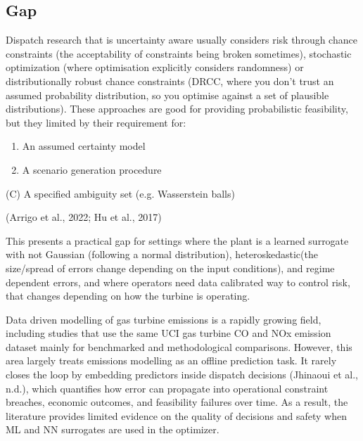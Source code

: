 \documentclass[11pt]{article}
\begin{document}
\subsection{Gap}\label{gap}

Dispatch research that is uncertainty aware usually considers risk
through chance constraints (the acceptability of constraints being
broken sometimes), stochastic optimization (where optimisation
explicitly considers randomness) or distributionally robust chance
constraints (DRCC, where you don't trust an assumed probability
distribution, so you optimise against a set of plausible distributions).
These approaches are good for providing probabilistic feasibility, but
they limited by their requirement for:

\begin{enumerate}
\def\labelenumi{(\Alph{enumi})}
\item
  An assumed certainty model
\item
  A scenario generation procedure
\end{enumerate}

(C) A specified ambiguity set (e.g. Wasserstein balls)

(Arrigo et al., 2022; Hu et al., 2017)

This presents a practical gap for settings where the plant is a learned
surrogate with not Gaussian (following a normal distribution),
heteroskedastic(the size/spread of errors change depending on the input
conditions), and regime dependent errors, and where operators need data
calibrated way to control risk, that changes depending on how the
turbine is operating.

Data driven modelling of gas turbine emissions is a rapidly growing
field, including studies that use the same UCI gas turbine CO and NOx
emission dataset mainly for benchmarked and methodological comparisons.
However, this area largely treats emissions modelling as an offline
prediction task. It rarely closes the loop by embedding predictors
inside dispatch decisions (Jhinaoui et al., n.d.), which quantifies how
error can propagate into operational constraint breaches, economic
outcomes, and feasibility failures over time. As a result, the
literature provides limited evidence on the quality of decisions and
safety when ML and NN surrogates are used in the optimizer.
\end{document}
